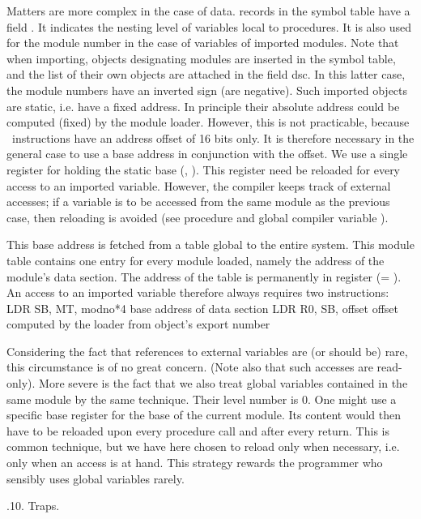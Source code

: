 Matters are more complex in the case of data.  records in the symbol table have a field . It indicates the nesting level of variables local to procedures. It is also used for the module number in the case of variables of imported modules. Note that when importing, objects designating modules are inserted in the symbol table, and the list of their own objects are attached in the field dsc. In this latter case, the module numbers have an inverted sign (are negative). Such imported objects are static, i.e. have a fixed address. In principle their absolute address could be computed (fixed) by the module loader. However, this is not practicable, because \RISC\ instructions have an address offset of 16 bits only. It is therefore necessary in the general case to use a base address in conjunction with the offset. We use a single register for holding the static base (, ). This register need be reloaded for every access to an imported variable. However, the compiler keeps track of external accesses; if a variable is to be accessed from the same module as the previous case, then reloading is avoided (see procedure  and global compiler variable ).

This base address is fetched from a table global to the entire system. This module table contains one entry for every module loaded, namely the address of the module's data section. The address of the table is permanently in register  (= ). An access to an imported variable therefore always requires two instructions:
\begintt
LDR SB, MT, modno*4   base address of data section
LDR R0, SB, offset    offset computed by the loader from
                      object's export number
\endtt

\noindent Considering the fact that references to external variables are (or should be) rare, this circumstance is of no great concern. (Note also that such accesses are read-only). More severe is the fact that we also treat global variables contained in the same module by the same technique. Their level number is 0. One might use a specific base register for the base of the current module. Its content would then have to be reloaded upon every procedure call and after every return. This is common technique, but we have here chosen to reload only when necessary, i.e. only when an access is at hand. This strategy rewards the programmer who sensibly uses global variables rarely.

.10. Traps.


